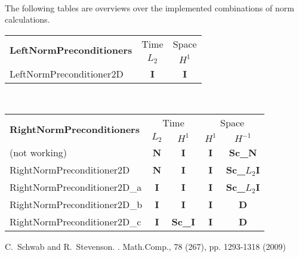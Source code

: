 \documentclass[11pt, fleqn]{article}
\begin{document}
\ \\
\noindent
The following tables are overviews over the implemented combinations of norm calculations.\\[2ex]
\begin{tabular}{l|c|c}
\multirow{2}{*}{{\bf LeftNormPreconditioners}}& {Time} & {Space} \\
& $L_{2}$ & $H^{1}$ \\
\hline
LeftNormPreconditioner2D & \bf{I} & {\bf I}
\end{tabular}
\ \\[2ex]
\begin{tabular}{l|cc|cc}
\multirow{2}{*}{{\bf RightNormPreconditioners}}& \multicolumn{2}{c|}{Time} & \multicolumn{2}{c}{Space} \\
& $L_{2}$ & $H^{1}$ & $H^{1}$ & $H^{-1}$\\
\hline
(not working) & {\bf N}& {\bf I} & {\bf I}& {\bf Sc\_N}\\
RightNormPreconditioner2D & {\bf N}& {\bf I} & {\bf I}& {\bf Sc\_$L_{2}$I}\\
RightNormPreconditioner2D\_a & {\bf I}& {\bf I} & {\bf I}& {\bf Sc\_$L_{2}$I}\\
RightNormPreconditioner2D\_b & {\bf I}& {\bf I} & {\bf I}& {\bf D}\\
RightNormPreconditioner2D\_c & {\bf I}& {\bf Sc\_I} & {\bf I}& {\bf D}
\end{tabular}



\begin{thebibliography}{Schwab} 
C.~Schwab and R.~Stevenson. 
. 
\newblock Math.Comp., 78 (267), pp. 1293-1318 (2009)

\end{thebibliography}
\end{document}
